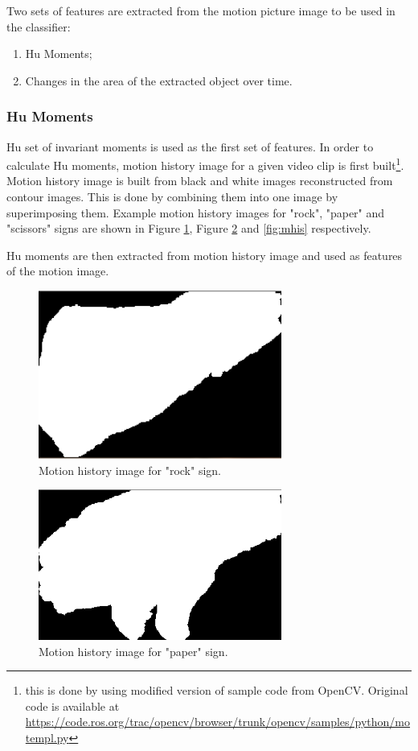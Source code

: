 Two sets of features are extracted from the motion picture image to be used in the classifier:

\begin{enumerate}
\item Hu Moments;
\item Changes in the area of the extracted object over time.
\end{enumerate}

\subsubsection*{Hu Moments}

Hu set of invariant moments is used as the first set of features. In order to calculate Hu moments, motion history image for a given video clip is first built\footnote{this is done by using modified version of sample code from OpenCV. Original code is available at \url{https://code.ros.org/trac/opencv/browser/trunk/opencv/samples/python/motempl.py}}. Motion history image is built from black and white images reconstructed from contour images. This is done by combining them into one image by superimposing them. Example motion history images for "rock", "paper" and "scissors" signs are shown in Figure \ref{fig:mhir}, Figure \ref{fig:mhip} and \ref{fig:mhis} respectively. 

Hu moments are then extracted from motion history image and used as features of the motion image.

\begin{figure}
\begin{center}
\includegraphics[width=80mm]{mhi_rock.png}
\caption{Motion history image for "rock" sign.}
\label{fig:mhir}
\end{center}
\end{figure}

\begin{figure}
\begin{center}
\includegraphics[width=80mm]{mhi_paper.png}
\caption{Motion history image for "paper" sign.}
\label{fig:mhip}
\end{center}
\end{figure}

